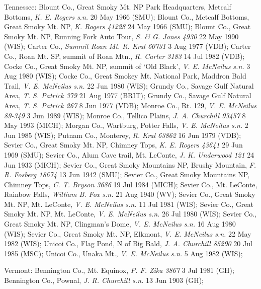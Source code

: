 \documentclass{article}
\begin{document}
Tennessee:
Blount Co., Great Smoky Mt. NP Park Headquarters, Metcalf Bottoms, \textit{K. E. Rogers s.n.} 20 May 1966 (SMU);
Blount Co., Metcalf Bottoms, Great Smoky Mt. NP, \textit{K. Rogers 41228} 24 May 1966 (SMU);
Blount Co., Great Smoky Mt. NP, Running Fork Auto Tour, \textit{S. \& G. Jones 4930} 22 May 1990 (WIS);
Carter Co., \textit{Summit Roan Mt. R. Kral 60731} 3 Aug 1977 (VDB);
Carter Co., Roan Mt. SP, summit of Roan Mtn., \textit{R. Carter 3183} 14 Jul 1982 (VDB);
Cocke Co., Great Smoky Mt. NP, summit of `Old Black', \textit{V. E. McNeilus s.n.} 3 Aug 1980 (WIS);
Cocke Co., Great Smokey Mt. National Park, Maddron Bald Trail, \textit{ V. E. McNeilus s.n.} 22 Jun 1980 (WIS);
Grundy Co., Savage Gulf Natural Area, \textit{T. S. Patrick 379} 21 Aug 1977 (BRIT);
Grundy Co., Savage Gulf Natural Area, \textit{T. S. Patrick 267} 8 Jun 1977 (VDB);
Monroe Co., Rt. 129, \textit{V. E. McNeilus 89-349} 3 Jun 1989 (WIS);
Monroe Co., Tellico Plains, \textit{J. A. Churchill 93457} 8 May 1993 (MICH);
Morgan Co., Wartburg, Potter Falls, \textit{V. E. McNeilus s.n.} 2 Jun 1985 (WIS);
Putnam Co., Monterey, \textit{R. Kral 63862} 16 Jun 1979 (VDB);
Sevier Co., Great Smoky Mt. NP, Chimney Tops, \textit{K. E. Rogers 43641} 29 Jun 1969 (SMU);
Sevier Co., Alum Cave trail, Mt. LeConte, \textit{J. K. Underwood 121} 24 Jun 1933 (MICH);
Sevier Co., Great Smoky Mountains NP, Brushy Mountain, \textit{F. R. Fosberg 18674} 13 Jun 1942 (SMU);
Sevier Co., Great Smoky Mountains NP, Chimney Tops, \textit{C. T. Bryson 3686} 19 Jul 1984 (MICH);
Sevier Co., Mt. LeConte, Rainbow Falls, \textit{William B. Fox s.n.} 21 Aug 1940 (WV);
Sevier Co., Great Smoky Mt. NP, Mt. LeConte, \textit{V. E. McNeilus s.n.} 11 Jul 1981 (WIS);
Sevier Co., Great Smoky Mt. NP, Mt. LeConte, \textit{V. E. McNeilus s.n.} 26 Jul 1980 (WIS);
Sevier Co., Great Smoky Mt. NP, Clingman's Dome, \textit{V. E. McNeilus s.n.} 16 Aug 1980 (WIS);
Sevier Co., Great Smoky Mt. NP, Elkmont, \textit{V. E. McNeilus s.n.} 22 May 1982 (WIS);
Unicoi Co., Flag Pond, N of Big Bald, \textit{J. A. Churchill 85290} 20 Jul 1985 (MSC);
Unicoi Co., Unaka Mt., \textit{V. E. McNeilus s.n.} 5 Aug 1982 (WIS);

Vermont:
Bennington Co., Mt. Equinox, \textit{P. F. Zika 3867} 3 Jul 1981 (GH);
Bennington Co., Pownal, \textit{J. R. Churchill s.n.} 13 Jun 1903 (GH);
\end{document}
